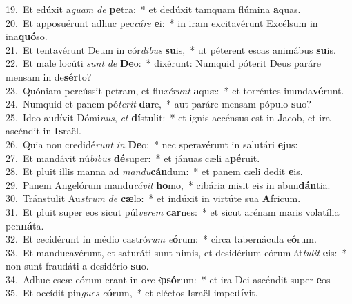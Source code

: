 {19.~}Et edúxit a\textit{quam} \textit{de} \textbf{pe}tra:~* et dedúxit tamquam flúmina \textbf{a}quas.\\
{20.~}Et apposuérunt adhuc pec\textit{cá}\textit{re} \textbf{e}i:~* in iram excitavérunt Excélsum in ina\textbf{quó}so.\\
{21.~}Et tentavérunt Deum in cór\textit{di}\textit{bus} \textbf{su}is,~* ut péterent escas animábus \textbf{su}is.\\
{22.~}Et male locúti \textit{sunt} \textit{de} \textbf{De}o:~* dixérunt: Numquid póterit Deus paráre mensam in de\textbf{sér}to?\\
{23.~}Quóniam percússit petram, et flu\textit{xé}\textit{runt} \textbf{a}quæ:~* et torréntes inunda\textbf{vé}runt.\\
{24.~}Numquid et panem pó\textit{te}\textit{rit} \textbf{da}re,~* aut paráre mensam pópulo \textbf{su}o?\\
{25.~}Ideo audívit Dómi\textit{nus}, \textit{et} \textbf{dí}stulit:~* et ignis accénsus est in Jacob, et ira ascéndit in \textbf{Is}raël.\\
{26.~}Quia non credidé\textit{runt} \textit{in} \textbf{De}o:~* nec speravérunt in salutári \textbf{e}jus:\\
{27.~}Et mandávit nú\textit{bi}\textit{bus} \textbf{dé}super:~* et jánuas cæli a\textbf{pé}ruit.\\
{28.~}Et pluit illis manna ad \textit{man}\textit{du}\textbf{cán}dum:~* et panem cæli dedit \textbf{e}is.\\
{29.~}Panem Angelórum mandu\textit{cá}\textit{vit} \textbf{ho}mo,~* cibária misit eis in abun\textbf{dán}tia.\\
{30.~}Tránstulit Au\textit{strum} \textit{de} \textbf{cæ}lo:~* et indúxit in virtúte sua \textbf{A}fricum.\\
{31.~}Et pluit super eos sicut púl\textit{ve}\textit{rem} \textbf{car}nes:~* et sicut arénam maris volatília pen\textbf{ná}ta.\\
{32.~}Et cecidérunt in médio castró\textit{rum} \textit{e}\textbf{ó}rum:~* circa tabernácula e\textbf{ó}rum.\\
{33.~}Et manducavérunt, et saturáti sunt nimis, et desidérium eórum át\textit{tu}\textit{lit} \textbf{e}is:~* non sunt fraudáti a desidério \textbf{su}o.\\
{34.~}Adhuc escæ eórum erant in o\textit{re} \textit{i}\textbf{psó}rum:~* et ira Dei ascéndit super \textbf{e}os\\
{35.~}Et occídit pin\textit{gues} \textit{e}\textbf{ó}rum,~* et eléctos Israël impe\textbf{dí}vit.\\
